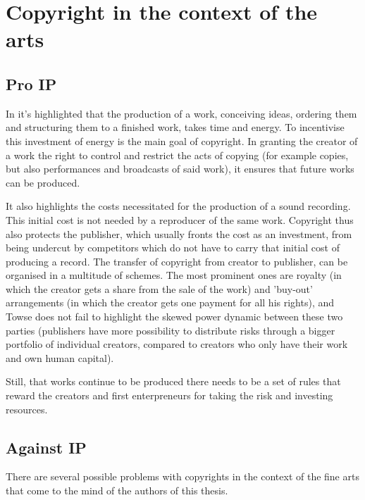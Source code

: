 \documentclass[a4paper]{report}
\begin{document}
\section{Copyright in the context of the arts}
\label{sec:CopyArts}

\subsection{Pro IP}
In \cite{Towse1999} it's highlighted that the production of a work, conceiving ideas, ordering them and structuring them to a finished work, takes time and energy. To incentivise this investment of energy is the main goal of copyright. In granting the creator of a work the right to control and restrict the acts of copying (for example copies, but also performances and broadcasts of said work), it ensures that future works can be produced.

It also highlights the costs necessitated for the production of a sound recording. This initial cost is not needed by a reproducer of the same work. Copyright thus also protects the publisher, which usually fronts the cost as an investment, from being undercut by competitors which do not have to carry that initial cost of producing a record. The transfer of copyright from creator to publisher, can be organised in a multitude of schemes. The most prominent ones are royalty (in which the creator gets a share from the sale of the work) and 'buy-out' arrangements (in which the creator gets one payment for all his rights), and Towse does not fail to highlight the skewed power dynamic between these two parties (publishers have more possibility to distribute risks through a bigger portfolio of individual creators, compared to creators who only have their work and own human capital).

Still, that works continue to be produced there needs to be a set of rules that reward the creators and first enterpreneurs for taking the risk and investing resources.

\subsection{Against IP}
There are several possible problems with copyrights in the context of the fine arts that come to the mind of the authors of this thesis. 
\end{document}
